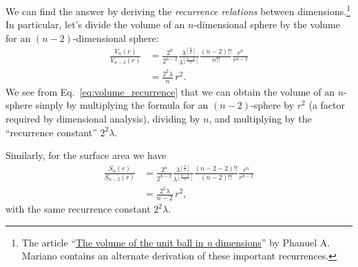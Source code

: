 We can find the answer by deriving the \emph{recurrence relations} between dimensions.\footnote{The article ``\href{http://www2.math.uconn.edu/~mariano/research/MathClubsp14\%20.pdf}{The volume of the unit ball in \emph{n} dimensions}'' by Phanuel A. Mariano contains an alternate derivation of these important recurrences.} In particular, let's divide the volume of an $n$-dimensional sphere by the volume for an $(n-2)$-dimensional sphere:
\begin{equation}
\label{eq:volume_recurrence}
\begin{split}
\frac{V_n(r)}{V_{n-2}(r)} & =
\frac{2^n}{2^{n-2}}
\frac{\lambda^{\left\lfloor \frac{n}{2} \right\rfloor}}{\lambda^{\left\lfloor \frac{n-2}{2} \right\rfloor}}
\frac{(n-2)!!}{n!!}
\frac{r^{n}}{r^{n-2}}
\\ & = \frac{2^2\lambda}{n}\,r^2.
\end{split}
\end{equation}
We see from Eq.~\eqref{eq:volume_recurrence} that we can obtain the volume of an $n$-sphere simply by multiplying the formula for an $(n-2)$-sphere by $r^2$ (a factor required by dimensional analysis), dividing by $n$, and multiplying by the ``recurrence constant'' $2^2\lambda$.

Similarly, for the surface area we have
\begin{equation}
\label{eq:surface_area_recurrence}
\begin{split}
\frac{S_n(r)}{S_{n-2}(r)} & =
\frac{2^n}{2^{n-2}}
\frac{\lambda^{\left\lfloor \frac{n}{2} \right\rfloor}}{\lambda^{\left\lfloor \frac{n-2}{2} \right\rfloor}}
\frac{(n-2-2)!!}{(n-2)!!}
\frac{r^{n}}{r^{n-2}}
\\ & = \frac{2^2\lambda}{n-2}\,r^2,
\end{split}
\end{equation}
with the same recurrence constant $2^2\lambda$.


